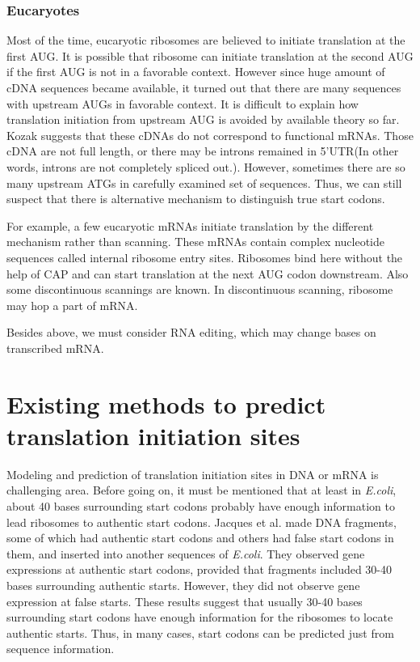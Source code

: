 \subsubsection{Eucaryotes}

Most of the time, eucaryotic ribosomes are believed to initiate
translation at the first AUG\cite{label1020}.  It is possible that
ribosome can initiate translation at the second AUG if the first AUG
is not in a favorable context. However since huge amount of cDNA
sequences became available, it turned out that there are many
sequences with upstream AUGs in favorable context. It is difficult to
explain how translation initiation from upstream AUG is avoided by
available theory so far. Kozak suggests that these cDNAs do not
correspond to functional mRNAs\cite{label1025}. Those cDNA are not
full length, or there may be introns remained in 5'UTR(In other words,
introns are not completely spliced out.). However, sometimes there are
so many upstream ATGs in carefully examined set of
sequences\cite{lnis1}. Thus, we can still suspect that there is
alternative mechanism to distinguish true start codons.

For example, a few eucaryotic mRNAs initiate translation by the different
mechanism rather than scanning\cite{label1155,label1154}. These mRNAs
contain complex nucleotide sequences called internal ribosome entry
sites. Ribosomes bind here without the help of CAP and can start
translation at the next AUG codon downstream\cite{label0}.  Also some
discontinuous scannings are known\cite{label1920,label4807}. In
discontinuous scanning, ribosome may hop a part of mRNA.

Besides above, we must consider RNA editing\cite{label1098}, which may
change bases on transcribed mRNA.

\section{Existing methods to predict translation initiation sites}

Modeling and prediction of translation initiation sites in DNA or mRNA
is challenging area. Before going on, it must be mentioned that at least
in {\it E.coli}, about 40 bases surrounding start codons probably have
enough information to lead ribosomes to authentic start codons. Jacques
et al.\cite{label7333} made DNA fragments, some of which had authentic
start codons and others had false start codons in them, and inserted
into another sequences of {\it E.coli}. They observed gene expressions
at authentic start codons, provided that fragments included 30-40 bases
surrounding authentic starts. However, they did not observe gene
expression at false starts. These results suggest that usually 30-40
bases surrounding start codons have enough information for the ribosomes
to locate authentic starts. Thus, in many cases, start codons can be
predicted just from sequence information.

